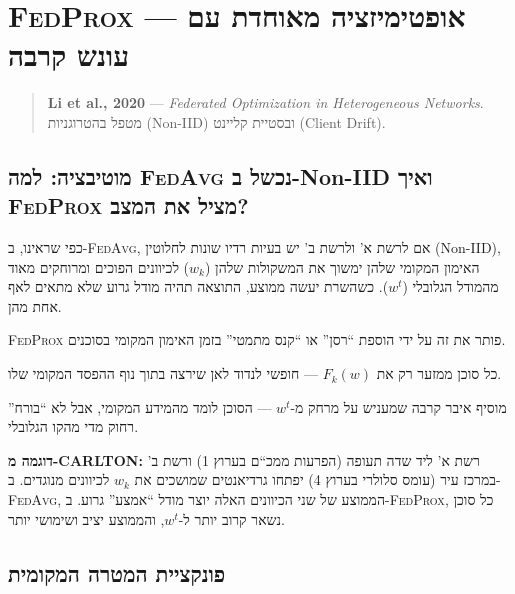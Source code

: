 \documentclass[11pt,a4paper]{article}
\newcommand{\FedAvg}{\textsc{FedAvg}}
\newcommand{\FedProx}{\textsc{FedProx}}
\begin{document}
\section{\FedProx{} --- אופטימיזציה מאוחדת עם עונש קרבה}
\label{sec:fedprox}

\begin{quote}
  \textbf{Li et al., 2020} --- \textit{Federated Optimization in Heterogeneous Networks}.\\
  מטפל בהטרוגניות (Non-IID) ובסטיית קליינט (Client Drift).
\end{quote}

\subsection{מוטיבציה: למה \FedAvg{} נכשל ב-Non-IID ואיך \FedProx{} מציל את המצב?}
\label{subsec:fedprox-motivation}

כפי שראינו, ב-\FedAvg, אם לרשת א' ולרשת ב' יש בעיות רדיו שונות לחלוטין (Non-IID), האימון המקומי שלהן ימשוך את המשקולות שלהן ($w_k$) לכיוונים הפוכים ומרוחקים מאוד מהמודל הגלובלי ($w^t$).
כשהשרת יעשה ממוצע, התוצאה תהיה מודל גרוע שלא מתאים לאף אחת מהן.

\FedProx{} פותר את זה על ידי הוספת ``רסן'' או ``קנס מתמטי'' בזמן האימון המקומי בסוכנים.

\begin{description}[style=nextline, leftmargin=2.8cm, labelwidth=2.5cm]
  \item[\FedAvg]
    כל סוכן ממזער רק את $F_k(w)$ --- חופשי לנדוד לאן שירצה בתוך נוף ההפסד המקומי שלו.

  \item[\FedProx]
    מוסיף איבר קרבה שמעניש על מרחק מ-$w^t$ --- הסוכן לומד מהמידע המקומי, אבל לא ``בורח'' רחוק מדי מהקו הגלובלי.
\end{description}

\textbf{דוגמה מ-CARLTON:}
רשת א' ליד שדה תעופה (הפרעות ממכ``ם בערוץ 1) ורשת ב' במרכז עיר (עומס סלולרי בערוץ 4) יפתחו גרדיאנטים שמושכים את $w_k$ לכיוונים מנוגדים.
ב-\FedAvg, הממוצע של שני הכיוונים האלה יוצר מודל ``אמצע'' גרוע.
ב-\FedProx, כל סוכן נשאר קרוב יותר ל-$w^t$, והממוצע יציב ושימושי יותר.

\subsection{פונקציית המטרה המקומית}
\label{subsec:fedprox-objective}
\end{document}
